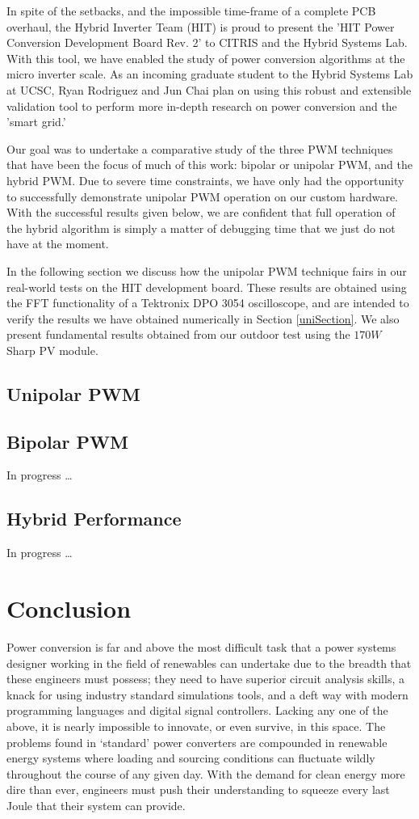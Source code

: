 In spite of the setbacks, and the impossible time-frame of a complete PCB overhaul, the Hybrid Inverter Team (HIT) is proud to present the 'HIT Power Conversion Development Board Rev. 2' to CITRIS and the Hybrid Systems Lab. With this tool, we have enabled the study of power conversion algorithms at the micro inverter scale. As an incoming graduate student to the Hybrid Systems Lab at UCSC, Ryan Rodriguez and Jun Chai plan on using this robust and extensible validation tool to perform more in-depth research on power conversion and the 'smart grid.' 

Our goal was to undertake a comparative study of the three PWM techniques that have been the focus of much of this work: bipolar or unipolar PWM, and the hybrid PWM. 
Due to severe time constraints, we have only had the opportunity to successfully demonstrate unipolar PWM operation on our custom hardware. With the successful results given below, we are confident that full operation of the hybrid algorithm is simply a matter of debugging time that we just do not have at the moment.

In the following section we discuss how the unipolar PWM technique fairs in our real-world tests on the HIT development board. These results are obtained using the FFT functionality of a Tektronix DPO 3054 oscilloscope, and are intended to verify the results we have obtained numerically in Section \ref{uniSection}. We also present fundamental results obtained from our outdoor test using the $170W$ Sharp PV module.

\subsection{Unipolar PWM}
\subsection{Bipolar PWM}
In progress \ldots
\subsection{Hybrid Performance}
In progress \ldots

\section{Conclusion}
Power conversion is far and above the most difficult task that a power systems designer working in the field of renewables can undertake due to the breadth that these engineers must possess; they need to have superior circuit analysis skills, a knack for using industry standard simulations tools, and a deft way with modern programming languages and digital signal controllers. Lacking any one of the above, it is nearly impossible to innovate, or even survive, in this space. The problems found in `standard' power converters are compounded in renewable energy systems where loading and sourcing conditions can fluctuate wildly throughout the course of any given day. With the demand for clean energy more dire than ever, engineers must push their understanding to squeeze every last Joule that their system can provide.

